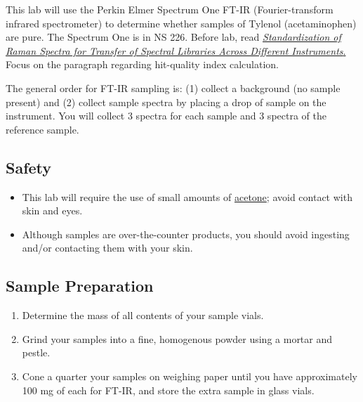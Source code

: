 \documentclass[]{tufte-book}
\providecommand{\tightlist}{%
  \setlength{\itemsep}{0pt}\setlength{\parskip}{0pt}}
\begin{document}
This lab will use the Perkin Elmer Spectrum One FT-IR (Fourier-transform infrared spectrometer) to determine whether samples of Tylenol (acetaminophen) are pure. The Spectrum One is in NS 226. Before lab, read \href{https://www.researchgate.net/publication/51602215_Standardization_of_Raman_spectra_for_transfer_of_spectral_libraries_across_different_instruments}{\emph{Standardization of Raman Spectra for Transfer of Spectral Libraries Across Different Instruments}.} Focus on the paragraph regarding hit-quality index calculation.

The general order for FT-IR sampling is: (1) collect a background (no sample present) and (2) collect sample spectra by placing a drop of sample on the instrument. You will collect 3 spectra for each sample and 3 spectra of the reference sample.

\hypertarget{safety-6}{%
\subsection*{Safety}\label{safety-6}}

\begin{itemize}
\tightlist
\item
  This lab will require the use of small amounts of \href{http://www.sciencelab.com/msds.php?msdsId=9927062}{acetone}; avoid contact with skin and eyes.
\item
  Although samples are over-the-counter products, you should avoid ingesting and/or contacting them with your skin.
\end{itemize}

\hypertarget{sample-preparation-3}{%
\subsection{Sample Preparation}\label{sample-preparation-3}}

\begin{enumerate}
\def\labelenumi{\arabic{enumi}.}
\tightlist
\item
  Determine the mass of all contents of your sample vials.
\item
  Grind your samples into a fine, homogenous powder using a mortar and pestle.
\item
  Cone a quarter your samples on weighing paper until you have approximately 100 mg of each for FT-IR, and store the extra sample in glass vials.
\end{enumerate}
\end{document}
